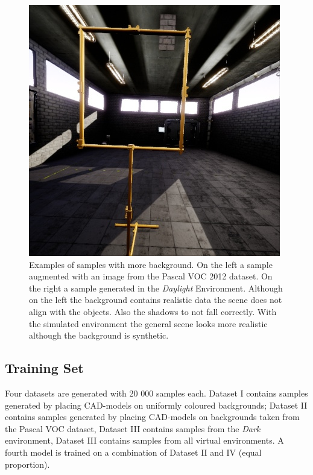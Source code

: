 \begin{figure}[hbtp]
\begin{minipage}{0.3\textwidth}
	\end{minipage}
	\begin{minipage}{0.3\textwidth}
		\includegraphics[width=\textwidth]{fig/sim}
	\end{minipage}
	\caption{Examples of samples with more background. On the left a sample augmented with an image from the Pascal VOC 2012 dataset. On the right a sample generated in the \textit{Daylight} Environment. Although on the left the background contains realistic data the scene does not align with the objects. Also the shadows to not fall correctly. With the simulated environment the general scene looks more realistic although the background is synthetic.}
	\label{fig:sim_vs_voc}
\end{figure}

\subsection{Training Set}

Four datasets are generated with 20 000 samples each. Dataset I contains samples generated by placing \ac{CAD}-models on uniformly coloured backgrounds; Dataset II contains samples generated by placing \ac{CAD}-models on backgrounds taken from the Pascal VOC dataset, Dataset III contains samples from the \textit{Dark} environment, Dataset III contains samples from all virtual environments. A fourth model is trained on a combination of Dataset II and IV (equal proportion).

